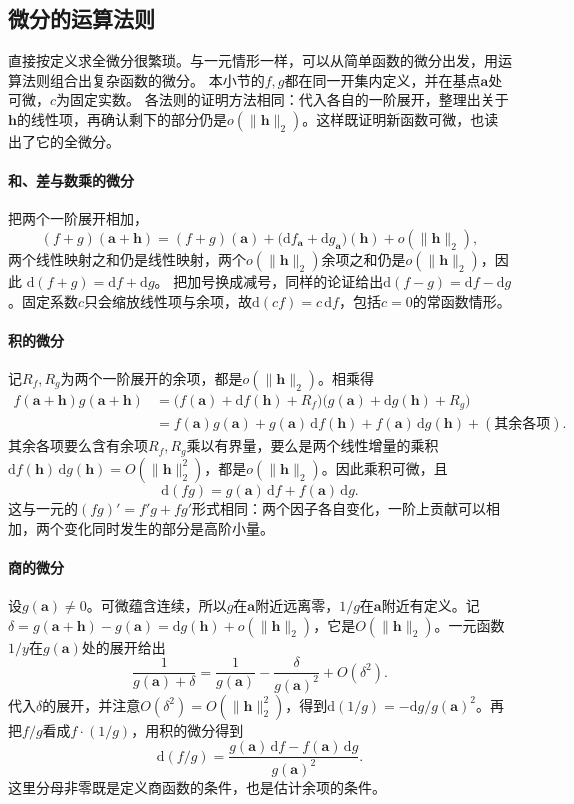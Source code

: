 \subsection{微分的运算法则}
\label{sec:multivariable-differential-rules}

直接按定义求全微分很繁琐。与一元情形一样，可以从简单函数的微分出发，用运算法则组合出复杂函数的微分。
本小节的$f,g$都在同一开集内定义，并在基点$\bm a$处可微，$c$为固定实数。
各法则的证明方法相同：代入各自的一阶展开，整理出关于$\bm h$的线性项，再确认剩下的部分仍是$o(\lVert\bm h\rVert_2)$。这样既证明新函数可微，也读出了它的全微分。

\paragraph{和、差与数乘的微分}
把两个一阶展开相加，
\[
 (f+g)(\bm a+\bm h)=(f+g)(\bm a)+\bigl(\mathrm df_{\bm a}+\mathrm dg_{\bm a}\bigr)(\bm h)+o(\lVert\bm h\rVert_2),
\]
两个线性映射之和仍是线性映射，两个$o(\lVert\bm h\rVert_2)$余项之和仍是$o(\lVert\bm h\rVert_2)$，因此
$\mathrm d(f+g)=\mathrm df+\mathrm dg$。
把加号换成减号，同样的论证给出$\mathrm d(f-g)=\mathrm df-\mathrm dg$。固定系数$c$只会缩放线性项与余项，故$\mathrm d(cf)=c\,\mathrm df$，包括$c=0$的常函数情形。

\paragraph{积的微分}
记$R_f,R_g$为两个一阶展开的余项，都是$o(\lVert\bm h\rVert_2)$。相乘得
\[
 \begin{aligned}
 f(\bm a+\bm h)g(\bm a+\bm h)
 &=\bigl(f(\bm a)+\mathrm df(\bm h)+R_f\bigr)\bigl(g(\bm a)+\mathrm dg(\bm h)+R_g\bigr)\\
 &=f(\bm a)g(\bm a)+g(\bm a)\,\mathrm df(\bm h)+f(\bm a)\,\mathrm dg(\bm h)+(\text{其余各项}).
 \end{aligned}
\]
其余各项要么含有余项$R_f,R_g$乘以有界量，要么是两个线性增量的乘积$\mathrm df(\bm h)\,\mathrm dg(\bm h)=O(\lVert\bm h\rVert_2^2)$，都是$o(\lVert\bm h\rVert_2)$。因此乘积可微，且
\[
 \mathrm d(fg)=g(\bm a)\,\mathrm df+f(\bm a)\,\mathrm dg.
\]
这与一元的$(fg)'=f'g+fg'$形式相同：两个因子各自变化，一阶上贡献可以相加，两个变化同时发生的部分是高阶小量。

\paragraph{商的微分}
设$g(\bm a)\neq0$。可微蕴含连续，所以$g$在$\bm a$附近远离零，$1/g$在$\bm a$附近有定义。记$\delta=g(\bm a+\bm h)-g(\bm a)=\mathrm dg(\bm h)+o(\lVert\bm h\rVert_2)$，它是$O(\lVert\bm h\rVert_2)$。一元函数$1/y$在$g(\bm a)$处的展开给出
\[
 \frac1{g(\bm a)+\delta}=\frac1{g(\bm a)}-\frac{\delta}{g(\bm a)^2}+O(\delta^2).
\]
代入$\delta$的展开，并注意$O(\delta^2)=O(\lVert\bm h\rVert_2^2)$，得到$\mathrm d(1/g)=-\mathrm dg/g(\bm a)^2$。再把$f/g$看成$f\cdot(1/g)$，用积的微分得到
\[
 \mathrm d(f/g)=\frac{g(\bm a)\,\mathrm df-f(\bm a)\,\mathrm dg}{g(\bm a)^2}.
\]
这里分母非零既是定义商函数的条件，也是估计余项的条件。

